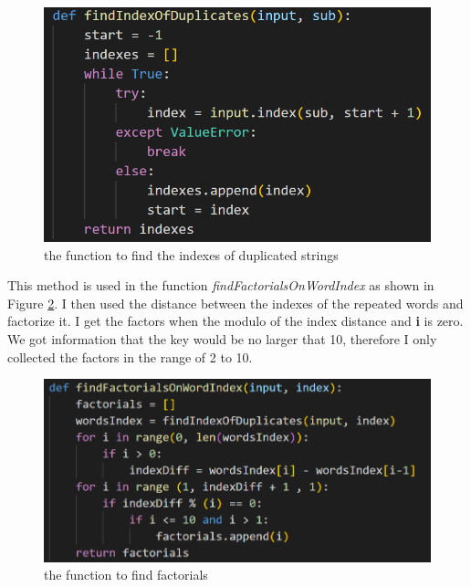 \documentclass[12pt, letterpaper]{article}
\begin{document}
\begin{figure}[H]
  \includegraphics[width=\linewidth]{code_snippets/findIndexOfDuplicates.PNG}
  \caption{the function to find the indexes of duplicated strings}
  \label{fig:findIndexOfDuplicates}
\end{figure}

This method is used in the function \textit{findFactorialsOnWordIndex} as shown in Figure \ref{fig:findFactorialsOnWordIndex}. I then used the distance between the indexes of the repeated words and factorize it. I get the factors when the modulo of the index distance and \textbf{i} is zero. We got information that the key would be no larger that 10, therefore I only collected the factors in the range of 2 to 10.

\begin{figure}[H]
  \includegraphics[width=\linewidth]{code_snippets/findFactorialsOnWordIndex.PNG}
  \caption{the function to find factorials}
  \label{fig:findFactorialsOnWordIndex}
\end{figure}
\end{document}

